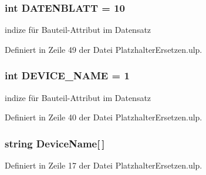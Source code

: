 \hypertarget{_platzhalter_ersetzen_8ulp_aaeb2c4795b541d0c2dd2b787afb421f2}{}
\subsubsection[{D\+A\+T\+E\+N\+B\+L\+A\+T\+T}]{\setlength{\rightskip}{0pt plus 5cm}int D\+A\+T\+E\+N\+B\+L\+A\+T\+T = 10}\label{_platzhalter_ersetzen_8ulp_aaeb2c4795b541d0c2dd2b787afb421f2}


indize für Bauteil-\/\+Attribut im Datensatz 



Definiert in Zeile 49 der Datei Platzhalter\+Ersetzen.\+ulp.

\hypertarget{_platzhalter_ersetzen_8ulp_a6fe0f5b0418b2132d12ac49aa4081291}{}
\subsubsection[{D\+E\+V\+I\+C\+E\+\_\+\+N\+A\+M\+E}]{\setlength{\rightskip}{0pt plus 5cm}int D\+E\+V\+I\+C\+E\+\_\+\+N\+A\+M\+E = 1}\label{_platzhalter_ersetzen_8ulp_a6fe0f5b0418b2132d12ac49aa4081291}


indize für Bauteil-\/\+Attribut im Datensatz 



Definiert in Zeile 40 der Datei Platzhalter\+Ersetzen.\+ulp.

\hypertarget{_platzhalter_ersetzen_8ulp_add6cc63e92e68ae325b1ecb08776c9b9}{}
\subsubsection[{Device\+Name}]{\setlength{\rightskip}{0pt plus 5cm}string Device\+Name\mbox{[}$\,$\mbox{]}}\label{_platzhalter_ersetzen_8ulp_add6cc63e92e68ae325b1ecb08776c9b9}


Definiert in Zeile 17 der Datei Platzhalter\+Ersetzen.\+ulp.

